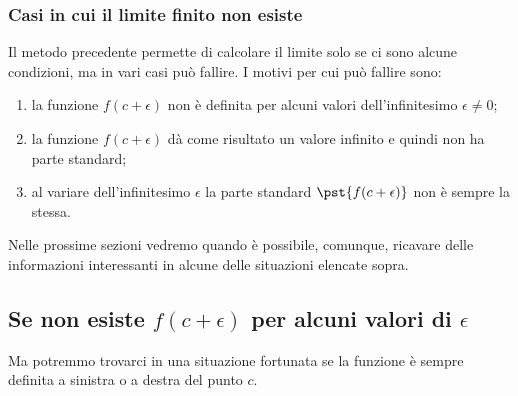 
\subsubsection{Casi in cui il limite finito non esiste}
\label{subsubsec:cont_limiti_nonesiste}

Il metodo precedente permette di calcolare il limite 
solo se ci sono alcune condizioni, ma in vari casi può fallire. 
I motivi per cui può fallire sono:
\begin{enumerate} [nosep]
\item la funzione \(f(c+\epsilon)\) non è definita per alcuni valori 
dell'infinitesimo \(\epsilon \neq 0\);
\item la funzione \(f(c+\epsilon)\) dà come risultato un valore infinito e 
quindi non ha parte standard; 
\item al variare dell'infinitesimo \(\epsilon\) la parte standard 
\(\pst{f(c+\epsilon)}\) non è sempre la stessa. 
\end{enumerate}

Nelle prossime sezioni vedremo quando è possibile, comunque, ricavare delle 
informazioni interessanti in alcune delle situazioni elencate sopra.

\subsection{Se non esiste \(f(c+\epsilon)\) per alcuni valori di 
\(\epsilon\)}
\label{subsec:cont_limiti_nonsempreesiste}


Ma potremmo trovarci in una situazione fortunata se la funzione è sempre 
definita a sinistra o a destra del punto \(c\).

